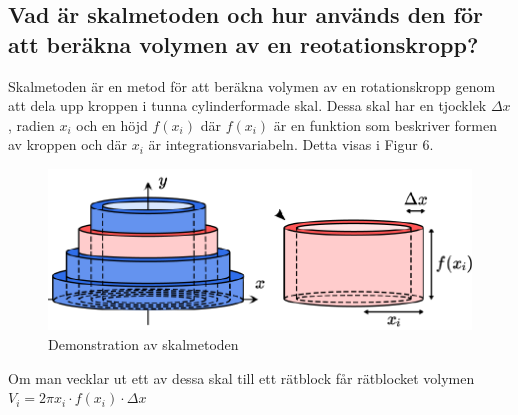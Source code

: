 \documentclass[12pt]{article}
\begin{document}
\subsection*{Vad är skalmetoden och hur används den för att beräkna volymen av en reotationskropp?}
Skalmetoden är en metod för att beräkna volymen av en rotationskropp genom att dela upp kroppen i tunna cylinderformade skal. Dessa skal har en tjocklek $\Delta x$, radien $x_i$ och en höjd $f(x_i)$ där $f(x_i)$ är en funktion som beskriver formen av kroppen och där $x_i$ är integrationsvariabeln. Detta visas i Figur 6.
\begin{figure}[H]
    \centering
    \renewcommand{\thefigure}{6}
    \includegraphics[width=\textwidth]{figur6.png}
    \caption{Demonstration av skalmetoden}
\end{figure}
Om man vecklar ut ett av dessa skal till ett rätblock får rätblocket volymen $V_i=2\pi x_i\cdot f(x_i)\cdot \Delta x$ 
\end{document}
